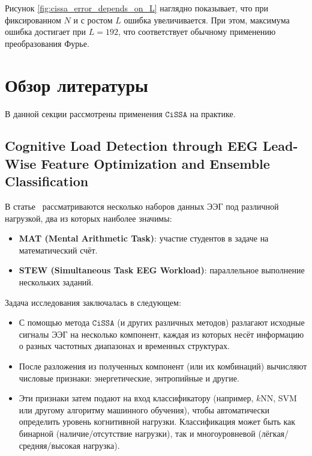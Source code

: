 \documentclass[12pt, specialist, subf
]{disser}
\theoremstyle{definition}
\newcommand{\CISSA}{\texttt{CiSSA}}
\begin{document}
Рисунок \ref{fig:cissa_error_depends_on_L} наглядно показывает, что при фиксированном $N$ и с ростом $L$ ошибка увеличивается. При этом, максимума ошибка достигает при $L = 192$, что соответствует обычному применению преобразования Фурье.




\section{Обзор литературы}


В данной секции рассмотрены применения $\CISSA$ на практике.

\subsection{Cognitive Load Detection through EEG Lead-Wise Feature Optimization and Ensemble Classification}

В статье~\cite{cognitive} рассматриваются несколько наборов данных ЭЭГ под различной нагрузкой, два из которых наиболее значимы:

\begin{itemize}
	\item \textbf{MAT (Mental Arithmetic Task)}: участие студентов в задаче на математический счёт.
	\item \textbf{STEW (Simultaneous Task EEG Workload)}: параллельное выполнение нескольких заданий.
\end{itemize}

Задача исследования заключалась в следующем:

\begin{itemize}
	\item С помощью метода $\CISSA$ (и других различных методов) разлагают исходные сигналы ЭЭГ на несколько компонент, каждая из которых несёт информацию о разных частотных диапазонах и временных структурах.
	\item После разложения из полученных компонент (или их комбинаций) вычисляют числовые признаки: энергетические, энтропийные и другие.
	\item Эти признаки затем подают на вход классификатору (например, $k$NN, SVM или другому алгоритму машинного обучения), чтобы автоматически определить уровень когнитивной нагрузки. Классификация может быть как бинарной (наличие/отсутствие нагрузки), так и многоуровневой (лёгкая/средняя/высокая нагрузка).
\end{itemize}
\end{document}

